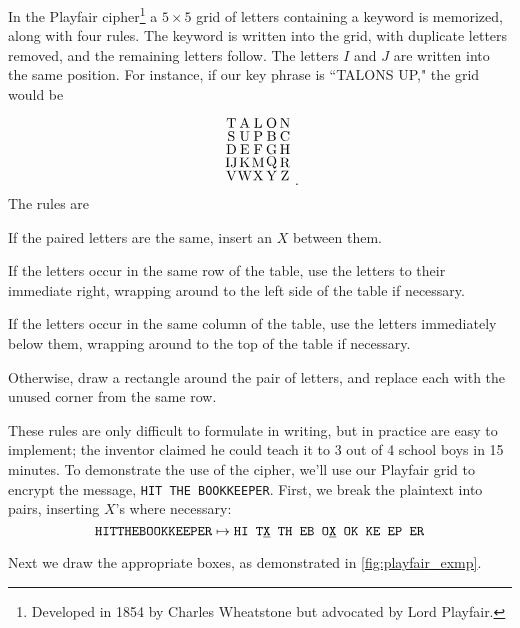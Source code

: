 \documentclass[m3380-lec-main.tex]{subfiles}
\begin{document}
In the Playfair cipher\footnote{Developed in 1854 by Charles Wheatstone but advocated by Lord Playfair.} a $5\times 5$ grid of letters containing a keyword is memorized, along with four rules. The keyword is written into the grid, with duplicate letters removed, and the remaining letters follow. The letters $I$ and $J$ are written into the same position. For instance, if our key phrase is ``TALONS UP," the grid would be 
{\tiny\[
\begin{tikzpicture}[scale=1/3]
\draw \foreach \y/\x/\z in {4/0/T,  4/1/A,  4/2/L,  4/3/O,  4/4/N,  3/0/S,  3/1/U,  3/2/P,  3/3/B,  3/4/C,  2/0/D,  2/1/E,  2/2/F,  2/3/G,  2/4/H,  1/0/IJ,  1/1/K,  1/2/M,  1/3/Q,  1/4/R,  0/0/V,  0/1/W,  0/2/X,  0/3/Y,  0/4/Z}{
    (\x+.5,\y+.5) node {\z}
};
\end{tikzpicture}.
\]}
The rules are
\begin{enum}
\item If the paired letters are the same, insert an $X$ between them.
\item If the letters occur in the same row of the table, use the letters to their immediate right, wrapping around to the left side of the table if necessary.
\item If the letters occur in the same column of the table, use the letters immediately below them, wrapping around to the top of the table if necessary.
\item Otherwise, draw a rectangle around the pair of letters, and replace each with the unused corner from the same row.
\end{enum}
These rules are only difficult to formulate in writing, but in practice are easy to implement; the inventor claimed he could teach it to 3 out of 4 school boys in 15 minutes. To demonstrate the use of the cipher, we'll use our Playfair grid to encrypt the message, \verb|HIT THE BOOKKEEPER|. First, we break the plaintext into pairs, inserting $X$'s where necessary:
\[\texttt{HITTHEBOOKKEEPER}\mapsto \texttt{HI~T\underline{X}~TH~EB~O\underline{X}~OK~KE~EP~ER}\]

\noindent Next we draw the appropriate boxes, as demonstrated in \autoref{fig:playfair_exmp}.
\end{document}
